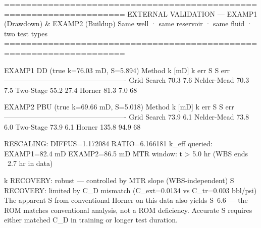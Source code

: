 ====================================================================
  EXTERNAL VALIDATION — EXAMP1 (Drawdown) & EXAMP2 (Buildup)
  Same well · same reservoir · same fluid · two test types
====================================================================

  EXAMP1 DD  (true k=76.03 mD, S=5.894)
  Method               k [mD]   k err       S   S err
  ----------------------------------------------------
  Grid Search            70.3    7.6%
  Nelder-Mead            70.3    7.5%
  Two-Stage              55.2   27.4%
  Horner                 81.3    7.0%
  68%

  EXAMP2 PBU  (true k=69.66 mD, S=5.018)
  Method               k [mD]   k err       S   S err
  ----------------------------------------------------
  Grid Search            73.9    6.1%
  Nelder-Mead            73.8    6.0%
  Two-Stage              73.9    6.1%
  Horner                135.8   94.9%
  68%

  RESCALING:  DIFFUS=1.172084  RATIO=6.166181
  k_eff queried: EXAMP1=82.4 mD  EXAMP2=86.5 mD
  MTR window: t > 5.0 hr  (WBS ends ~2.7 hr in data)

  k RECOVERY:  robust — controlled by MTR slope (WBS-independent)
  S RECOVERY:  limited by C_D mismatch (C_ext=0.0134 vs C_tr=0.003 bbl/psi)
    The apparent S from conventional Horner on this data also yields
    S~6.6 — the ROM matches conventional analysis, not a ROM deficiency.
    Accurate S requires either matched C_D in training or longer test duration.
